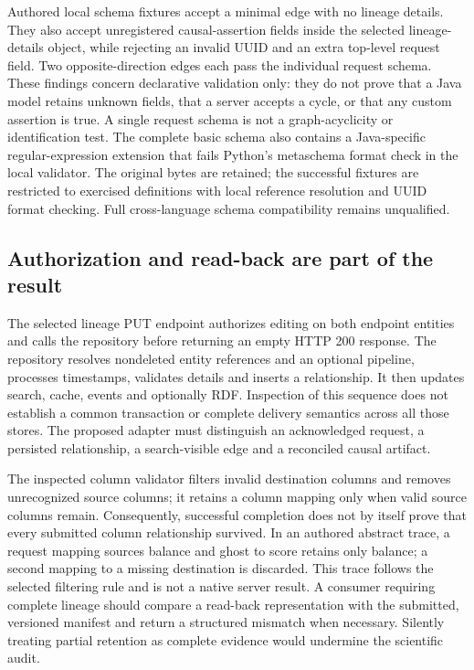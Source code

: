 Authored local schema fixtures accept a minimal edge with no lineage details.
They also accept unregistered causal-assertion fields inside the selected
lineage-details object, while rejecting an invalid UUID and an extra top-level
request field. Two opposite-direction edges each pass the individual request
schema. These findings concern declarative validation only: they do not prove
that a Java model retains unknown fields, that a server accepts a cycle, or that
any custom assertion is true. A single request schema is not a graph-acyclicity
or identification test. The complete basic schema also contains a Java-specific
regular-expression extension that fails Python's metaschema format check in the
local validator. The original bytes are retained; the successful fixtures are
restricted to exercised definitions with local reference resolution and UUID
format checking. Full cross-language schema compatibility remains unqualified.
\citep{exec24_openmetadata_source,exec24_openmetadata_reference}

\subsection{Authorization and read-back are part of the result}

The selected lineage PUT endpoint authorizes editing on both endpoint entities
and calls the repository before returning an empty HTTP 200 response. The
repository resolves nondeleted entity references and an optional pipeline,
processes timestamps, validates details and inserts a relationship. It then
updates search, cache, events and optionally RDF. Inspection of this sequence
does not establish a common transaction or complete delivery semantics across
all those stores. The proposed adapter must distinguish an acknowledged request,
a persisted relationship, a search-visible edge and a reconciled causal artifact.
\citep{exec24_openmetadata_source}

The inspected column validator filters invalid destination columns and removes
unrecognized source columns; it retains a column mapping only when valid source
columns remain. Consequently, successful completion does not by itself prove
that every submitted column relationship survived. In an authored abstract
trace, a request mapping sources balance and ghost to score retains only
balance; a second mapping to a missing destination is discarded. This trace
follows the selected filtering rule and is not a native server result. A consumer
requiring complete lineage should compare a read-back representation with the
submitted, versioned manifest and return a structured mismatch when necessary.
Silently treating partial retention as complete evidence would undermine the
scientific audit.~\citep{exec24_openmetadata_source,exec24_openmetadata_reference}


